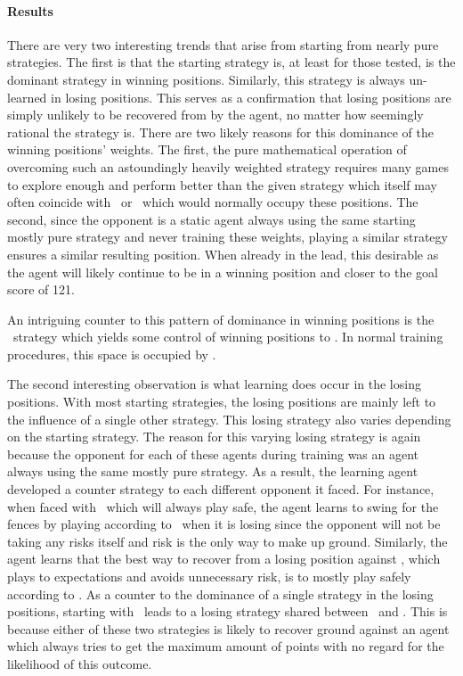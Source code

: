 


\paragraph*{Results}

There are very two interesting trends that arise from starting from nearly pure
strategies.
%
The first is that the starting strategy is,
at least for those tested,
is the dominant strategy in winning positions.
%
Similarly,
this strategy is always un-learned in losing positions.
%
This serves as a confirmation that losing positions are simply unlikely to be
recovered from by the agent,
no matter how seemingly rational the strategy is.
%
There are two likely reasons for this dominance of the winning positions'
weights.
%
The first,
the pure mathematical operation of overcoming such an astoundingly heavily
weighted strategy requires many games to explore enough and perform better than
the given strategy
which itself may often coincide with \handmaxavg\ or \handmaxmin\ 
which would normally occupy these positions.
%
The second,
since the opponent is a static agent always using the same starting
mostly pure strategy and never training these weights,
playing a similar strategy ensures a similar resulting position.
%
When already in the lead,
this desirable as the agent will likely continue to be in a winning position
and closer to the goal score of 121.

An intriguing counter to this pattern of dominance in winning positions
is the \handmaxavg\ strategy
which yields some control of winning positions to \handmaxmed.
%
In normal training procedures,
this space is occupied by \handmaxmin.

The second interesting observation is what learning does occur
in the losing positions.
%
With most starting strategies,
the losing positions are mainly left to the influence of a single
other strategy.
%
This losing strategy also varies depending on the starting strategy.
%
The reason for this varying losing strategy is again
because the opponent for each of these agents during training
was an agent always using the same mostly pure strategy.
%
As a result,
the learning agent developed a counter strategy to each different
opponent it faced.
%
For instance,
when faced with \handmaxmin\ which will always play safe,
the agent learns to swing for the fences by playing according to \handmaxposs\ 
when it is losing
since the opponent will not be taking any risks itself
and risk is the only way to make up ground.
%
Similarly,
the agent learns that the best way to recover from a losing position
against \handmaxavg,
which plays to expectations and avoids unnecessary risk,
is to mostly play safely according to \handmaxmin.
%
As a counter to the dominance of a single strategy in the losing positions,
starting with \handmaxposs\ leads to a losing strategy
shared between \handmaxavg\ and \handmaxmed.
%
This is because either of these two strategies is likely to recover ground
against an agent which always tries to get the maximum amount of points
with no regard for the likelihood of this outcome.

